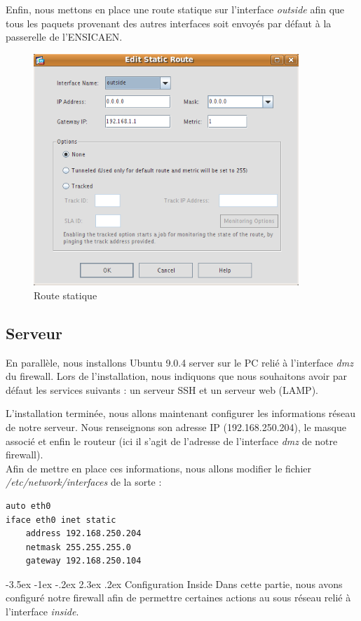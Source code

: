 \documentclass[a4paper,12pt]{article}
\makeatletter
\renewcommand\section{\@startsection {section}{1}{\z@}%
                           {-3.5ex \@plus -1ex \@minus -.2ex}%
                           {2.3ex \@plus.2ex}%
                           {\normalfont\Large\bfseries}}
\makeatother
\begin{document}
Enfin, nous mettons en place une route statique sur l'interface \textit{outside} afin que tous les paquets provenant des autres interfaces soit envoyés par
défaut à la passerelle de l'ENSICAEN.
\begin{figure}[H]
	\center
	\includegraphics[width=10cm]{img/2-statiqueroute.png}
	\caption{Route statique}
\end{figure}


\subsection{Serveur}
En parallèle, nous installons \og Ubuntu 9.0.4 server \fg{} sur le PC relié à l'interface \textit{dmz} du firewall. Lors de l'installation, nous indiquons que nous souhaitons avoir par défaut les services suivants : un serveur SSH et un serveur web (LAMP).

L'installation terminée, nous allons maintenant configurer les informations réseau de notre serveur. Nous renseignons son adresse IP (192.168.250.204), le masque associé et enfin le routeur (ici il s'agit de l'adresse de l'interface \textit{dmz} de notre firewall).\\
Afin de mettre en place ces informations, nous allons modifier le fichier \textit{/etc/network/interfaces} de la sorte :
\begin{lstlisting}
auto eth0 
iface eth0 inet static
    address 192.168.250.204
    netmask 255.255.255.0
    gateway 192.168.250.104
\end{lstlisting}






\newpage
\section{Configuration Inside}
Dans cette partie, nous avons configuré notre firewall afin de permettre certaines actions au sous réseau relié à l'interface \textit{inside}.
\end{document}
